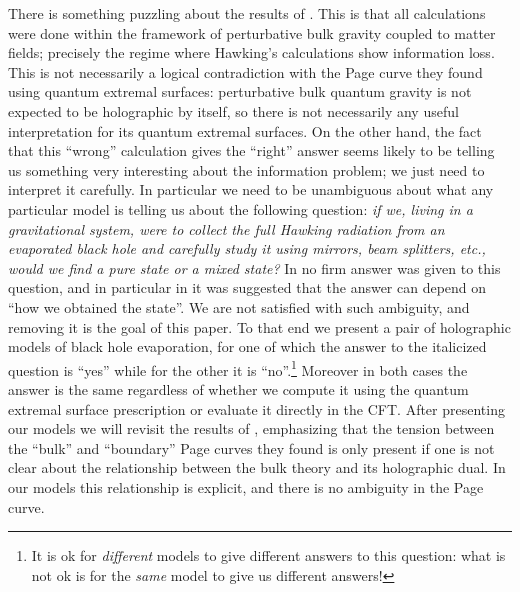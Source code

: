 \documentclass[12pt]{article}
\theoremstyle{definition}
\begin{document}
There is something puzzling about the results of \cite{Almheiri:2019psf,Penington:2019npb,Almheiri:2019hni}.  This is that all calculations were done within the framework of perturbative bulk gravity coupled to matter fields; precisely the regime where Hawking's calculations show information loss.  This is not necessarily a logical contradiction with the Page curve they found using quantum extremal surfaces: perturbative bulk quantum gravity is not expected to be holographic by itself, so there is not necessarily any useful interpretation for its quantum extremal surfaces.  On the other hand, the fact that this ``wrong'' calculation gives the ``right'' answer seems likely to be telling us something very interesting about the information problem; we just need to interpret it carefully.  In particular we need to be unambiguous about what any particular model is telling us about the following question: \textit{if we, living in a gravitational system, were to collect the full Hawking radiation from an evaporated black hole and carefully study it using mirrors, beam splitters, etc., would we find a pure state or a mixed state?}  In \cite{Almheiri:2019psf,Penington:2019npb,Almheiri:2019hni} no firm answer was given to this question, and in particular in \cite{Almheiri:2019hni} it was suggested that the answer can depend on ``how we obtained the state''.    We are not satisfied with such ambiguity, and removing it is the goal of this paper.  To that end we present a pair of holographic models of black hole evaporation, for one of which the answer to the italicized question is ``yes'' while for the other it is ``no''.\footnote{It is ok for \textit{different} models to give different answers to this question: what is not ok is for the \textit{same} model to give us different answers!}  Moreover in both cases the answer is the same regardless of whether we compute it using the quantum extremal surface prescription or evaluate it directly in the CFT.  After presenting our models we will revisit the results of \cite{Almheiri:2019psf,Penington:2019npb,Almheiri:2019hni}, emphasizing that the tension between the ``bulk'' and ``boundary'' Page curves they found is only present if one is not clear about the relationship between the bulk theory and its holographic dual.   In our models this relationship is explicit, and there is no ambiguity in the Page curve.  
\end{document}
